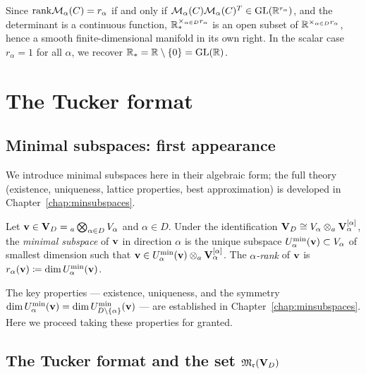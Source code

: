 \begin{remark}
\label{rem:Rstar_open}
Since $\mathrm{rank} \mathcal{M}_{\alpha}(C) = r_\alpha$ if and only if
$\mathcal{M}_{\alpha}(C)\mathcal{M}_{\alpha}(C)^T \in \mathrm{GL}(\mathbb{R}^{r_\alpha})$,
and the determinant is a continuous function,
$\mathbb{R}^{\times_{\alpha \in D} r_\alpha}_*$ is an open subset of
$\mathbb{R}^{\times_{\alpha \in D} r_\alpha}$, hence a smooth finite-dimensional
manifold in its own right. In the scalar case $r_\alpha = 1$ for all
$\alpha$, we recover $\mathbb{R}_* = \mathbb{R} \setminus \{0\} = \mathrm{GL}(\mathbb{R})$.
\end{remark}

\section{The Tucker format}
\label{sec:algtensor:tucker}

\subsection*{Minimal subspaces: first appearance}

We introduce minimal subspaces here in their algebraic form; the full
theory (existence, uniqueness, lattice properties, best approximation)
is developed in Chapter~\ref{chap:minsubspaces}.

\begin{definition}
\label{def:minimal_subspace_algebraic}
Let $\mathbf{v} \in \mathbf{V}_D = {}_a\bigotimes_{\alpha \in D} V_\alpha$ and
$\alpha \in D$. Under the identification $\mathbf{V}_D \cong V_\alpha \otimes_a
\mathbf{V}_\alpha^{[\alpha]}$, the \emph{minimal subspace} of $\mathbf{v}$ in
direction $\alpha$ is the unique subspace $U^{\min}_{\alpha}(\mathbf{v}) \subset V_\alpha$
of smallest dimension such that
$\mathbf{v} \in U^{\min}_{\alpha}(\mathbf{v}) \otimes_a \mathbf{V}_\alpha^{[\alpha]}$.
The \emph{$\alpha$-rank} of $\mathbf{v}$ is $r_\alpha(\mathbf{v}) \coloneqq \dim U^{\min}_{\alpha}(\mathbf{v})$.
\end{definition}

The key properties — existence, uniqueness, and the symmetry
$\dim U^{\min}_{\alpha}(\mathbf{v}) = \dim U^{\min}_{D \setminus \{\alpha\}}(\mathbf{v})$ —
are established in Chapter~\ref{chap:minsubspaces}. Here we proceed
taking these properties for granted.

\subsection*{The Tucker format and the set $\mathfrak{M}_{\mathfrak{r}}(\mathbf{V}_D)$}

